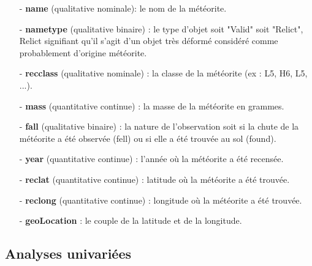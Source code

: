 \documentclass[12pt]{article}
\begin{document}
{\setlength{\baselineskip}{1.5\baselineskip} %
\begin{itemize}
\item[-] \textbf{name} (qualitative nominale): le nom de la météorite.
\item[-] \textbf{nametype} (qualitative binaire) : le type d'objet soit "Valid" soit "Relict", Relict signifiant qu'il s'agit d'un objet très déformé considéré comme probablement d'origine météorite.
\item[-] \textbf{recclass} (qualitative nominale) : la classe de la météorite (ex : L5, H6, L5, ...).
\item[-] \textbf{mass} (quantitative continue) : la masse de la météorite en grammes.
\item[-] \textbf{fall} (qualitative binaire) : la nature de l'observation soit si la chute de la météorite a été observée (fell) ou si elle a été trouvée au sol (found).
\item[-] \textbf{year} (quantitative continue) : l'année où la météorite a été recensée.
\item[-] \textbf{reclat} (quantitative continue) : latitude où la météorite a été trouvée.
\item[-] \textbf{reclong} (quantitative continue) : longitude où la météorite a été trouvée.
\item[-] \textbf{geoLocation} : le couple de la latitude et de la longitude.
\end{itemize}
} %

\subsection{Analyses univariées}
\end{document}

